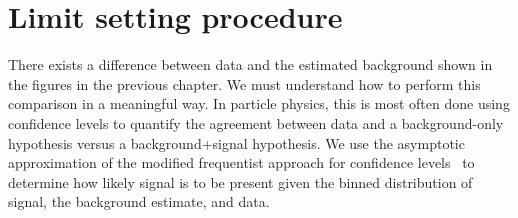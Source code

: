 


\section{Limit setting procedure}

There exists a difference between data and the estimated background shown in the figures in the previous chapter. We must understand how to perform this comparison in a meaningful way. In particle physics, this is most often done using confidence levels to quantify the agreement between data and a background-only hypothesis versus a background+signal hypothesis. 
We use the asymptotic approximation of the modified frequentist approach for confidence levels~\cite{Junk:1999kv, Read:2002hq, Conway:1333496} to determine how likely signal is to be present given the binned distribution of signal, the background estimate, and data. 
